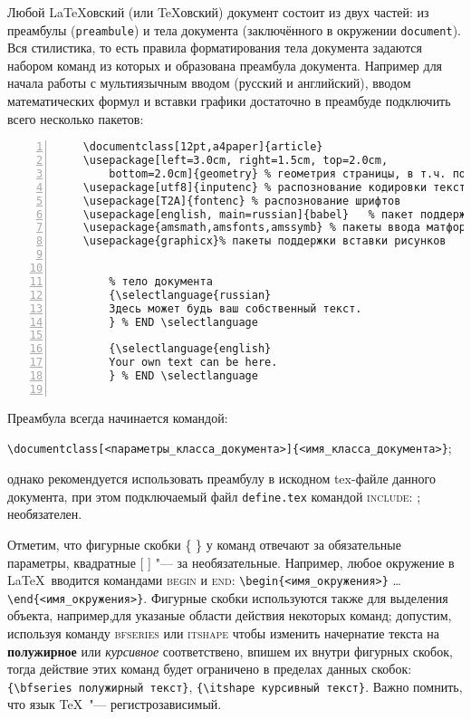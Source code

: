 Любой \LaTeX овский (или \TeX овский) документ состоит из двух частей: из преамбулы (\texttt{preambule}) и тела документа (заключённого в окружении \texttt{document}). Вся стилистика, то есть правила форматирования тела документа задаются набором команд из которых и образована преамбула документа. Например для начала работы с мультиязычным вводом (русский и английский), вводом математических формул и вставки графики достаточно в преамбуде подключить всего несколько пакетов:
\begin{Verbatim}[frame = single, label = {Пример tex\nobreak-файла \LaTeXовского документа}, fontfamily = courier, tabsize = 3, numbers = left, gobble=1]
	% преамбула документа
	\documentclass[12pt,a4paper]{article}
	\usepackage[left=3.0cm, right=1.5cm, top=2.0cm,
		bottom=2.0cm]{geometry}	% геометрия страницы, в т.ч. поля
	\usepackage[utf8]{inputenc}	% распознование кодировки текста в tex-файле
	\usepackage[T2A]{fontenc} % распознование шрифтов
	\usepackage[english, main=russian]{babel}	% пакет поддержки орфографий
	\usepackage{amsmath,amsfonts,amssymb} % пакеты ввода матформул
	\usepackage{graphicx}% пакеты поддержки вставки рисунков

	
		% тело документа
		{\selectlanguage{russian}
		Здесь может будь ваш собственный текст.
		} % END \selectlanguage

		{\selectlanguage{english}
		Your own text can be here.
		} % END \selectlanguage
	
\end{Verbatim}
Преамбула всегда начинается командой:

\verb|\documentclass[<параметры_класса_документа>]{<имя_класса_документа>}|;

\noindent однако рекомендуется использовать преамбулу в искодном tex\nobreak-файле данного документа, при этом подключаемый файл \texttt{define.tex} командой \textsc{include}: \verb||; необязателен.

Отметим, что фигурные скобки \textsc{\{ \}} у команд отвечают за обязательные параметры, квадратные \textsc{[ ]} "--- за необязательные. Например, любое окружение в \LaTeX\ вводится командами \textsc{begin} и \textsc{end}: \verb|\begin{<имя_окружения>}| \ldots \verb|\end{<имя_окружения>}|.
Фигурные скобки используются также для выделения объекта, например,для указаные области действия некоторых команд; допустим, используя команду \textsc{bfseries} или \textsc{itshape} чтобы изменить начернатие текста на {\bfseries полужирное} или {\itshape курсивное} соответствено, впишем их внутри фигурных скобок, тогда действие этих команд будет ограничено в пределах данных скобок: \verb|{\bfseries полужирный текст}|, \verb|{\itshape курсивный текст}|. Важно помнить, что язык \TeX\ "--- регистрозависимый.

